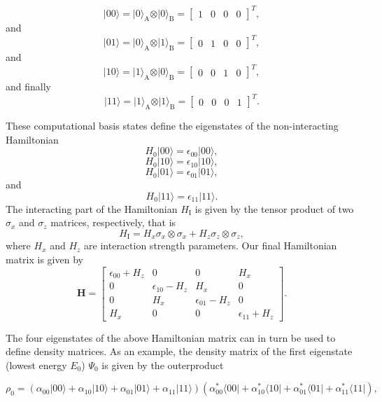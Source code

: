 \documentclass[%
oneside,                 %
final,                   %
10pt]{article}
\begin{document}
\[
\vert 00\rangle = \vert 0\rangle_{\mathrm{A}}\otimes \vert 0\rangle_{\mathrm{B}}=\begin{bmatrix} 1 & 0 & 0 &0\end{bmatrix}^T,
\]
and
\[
\vert 01\rangle = \vert 0\rangle_{\mathrm{A}}\otimes \vert 1\rangle_{\mathrm{B}}=\begin{bmatrix} 0 & 1 & 0 &0\end{bmatrix}^T,
\]
and
\[
\vert 10\rangle = \vert 1\rangle_{\mathrm{A}}\otimes \vert 0\rangle_{\mathrm{B}}=\begin{bmatrix} 0 & 0 & 1 &0\end{bmatrix}^T,
\]
and finally
\[
\vert 11\rangle = \vert 1\rangle_{\mathrm{A}}\otimes \vert 1\rangle_{\mathrm{B}}=\begin{bmatrix} 0 & 0 & 0 &1\end{bmatrix}^T.
\]

These computational basis states define the eigenstates of the non-interacting  Hamiltonian
\[
H_0\vert 00 \rangle = \epsilon_{00}\vert 00 \rangle,
\]
\[
H_0\vert 10 \rangle = \epsilon_{10}\vert 10 \rangle,
\]
\[
H_0\vert 01 \rangle = \epsilon_{01}\vert 01 \rangle,
\]
and
\[
H_0\vert 11 \rangle = \epsilon_{11}\vert 11 \rangle.
\]
The interacting part of the Hamiltonian $H_{\mathrm{I}}$ is given by the tensor product of two $\sigma_x$ and $\sigma_z$  matrices, respectively, that is
\[
H_{\mathrm{I}}=H_x\sigma_x\otimes\sigma_x+H_z\sigma_z\otimes\sigma_z,
\]
where $H_x$ and $H_z$ are interaction strength parameters. Our final Hamiltonian matrix is given by
\[
\bm{H}=\begin{bmatrix} \epsilon_{00}+H_z & 0 & 0 & H_x \\
                       0  & \epsilon_{10}-H_z & H_x & 0 \\
		       0 & H_x & \epsilon_{01}-H_z & 0 \\
		       H_x & 0 & 0 & \epsilon_{11} +H_z \end{bmatrix}.
\] 

The four eigenstates of the above Hamiltonian matrix can in turn be used to
define density matrices. As an example, the density matrix of the
first eigenstate (lowest energy $E_0$) $\Psi_0$ is given by the outerproduct

\[
\rho_0=\left(\alpha_{00}\vert 00 \rangle+\alpha_{10}\vert 10 \rangle+\alpha_{01}\vert 01 \rangle+\alpha_{11}\vert 11 \rangle\right)\left(\alpha_{00}^*\langle 00\vert+\alpha_{10}^*\langle 10\vert+\alpha_{01}^*\langle 01\vert+\alpha_{11}^*\langle 11\vert\right),
\]
\end{document}
